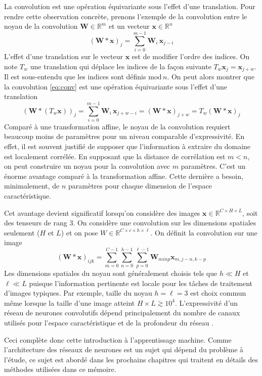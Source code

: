 La convolution est une opération équivariante sous l'effet d'une translation. 
Pour rendre cette observation concrète, prenons l'exemple de la convolution entre le noyau de la convolution $\mathbf{W} \in \mathbb{R}^{m}$ 
et un vecteur $\mathbf{x} \in \mathbb{R}^{n}$
\begin{equation}\label{eq:conv}
        (\mathbf{W} * \mathbf{x})_j = \sum_{i = 0}^{m-1} \mathbf{W}_i\, \mathbf{x}_{j - i}
\end{equation} 
L'effet d'une translation sur le vecteur $\mathbf{x}$ est de modifier l'ordre des indices. On note $T_{w}$ une translation 
qui déplace les indices de la façon suivante $T_w\mathbf{x}_{j} = \mathbf{x}_{j+w}$. Il est sous-entendu que les indices sont définis $\mathrm{mod}\, n$. 
On peut alors montrer que la convolution \eqref{eq:conv} est une opération équivariante sous l'effet d'une translation 
\begin{equation}
        (\mathbf{W} *(T_w\mathbf{x}))_j = \sum_{i = 0}^{m-1} \mathbf{W}_i\, \mathbf{x}_{j + w - i} = (\mathbf{W} * \mathbf{x})_{j + w} = T_w(\mathbf{W} * \mathbf{x})_{j}
\end{equation} 
Comparé à une transformation affine, le noyau de la convolution requiert beaucoup moins de paramètres pour un niveau comparable d'expressivité. En effet, 
il est souvent justifié de supposer que l'information à extraire du domaine est localement corrélée. 
En supposant que la distance de corrélation est $m< n$, on peut construire un noyau pour la convolution avec $m$ paramètres. C'est un énorme  
avantage comparé à la transformation affine. Cette dernière a besoin, minimalement, de $n$ paramètres pour chaque dimension 
de l'espace caractéristique.

Cet avantage devient significatif lorsqu'on considère des images $\mathbf{x} \in \mathbb{R}^{C \times H\times L}$, soit des tenseurs de rang 3. 
On considère une convolution sur les dimensions spatiales seulement ($H$ et $L$) et on pose ${W \in \mathbb{R}^{C \times c \times h \times \ell }}$. On définit la convolution sur une image 
\begin{equation}
        (\mathbf{W} * \mathbf{x})_{ijk} = \sum_{m=0}^{C-1} \sum_{n=0}^{h-1}\sum_{p=0}^{\ell-1}\mathbf{W}_{minp} \mathbf{x}_{m,j-n,k-p}
\end{equation} 
Les dimensions spatiales du noyau sont généralement choisis tels que $h \ll H$ et $\ell \ll L$ 
puisque l'information pertinente est locale pour les tâches de traitement d'images typiques. Par 
exemple, taille du noyau $h = \ell = 3 $ est choix commun même lorsque la taille d'une image atteint $H \times L \gtrsim 10^4$. L'expressivité d'un réseau de neurones 
convolutifs \citep{LeCun1995} dépend principalement du nombre de canaux utilisés pour l'espace caractéristique 
et de la profondeur du réseau \citep{Krizhevsky2012}.

Ceci complète donc cette introduction à l'apprentissage machine. Comme l'architecture des réseaux 
de neurones est un sujet qui dépend du problème à l'étude, ce sujet est abordé dans 
les prochains chapitres qui traitent en détails des méthodes utilisées dans ce mémoire.

